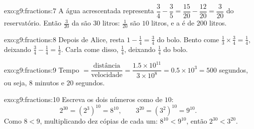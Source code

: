 \begin{solution}{exo:g9:fractions:7}
A água acrescentada representa
$\dfrac34 - \dfrac35 = \dfrac{15}{20} - \dfrac{12}{20} =
\dfrac{3}{20}$ do reservatório. Então $\frac{3}{20}$ da  são
$30$ litros: $\frac{1}{20}$ são $10$ litros, e a  é de $200$
litros.
\end{solution}

\begin{solution}{exo:g9:fractions:8}
Depois de Alice, resta $1 - \frac14 = \frac34$ do bolo. Bento come
$\frac13 \times \frac34 = \frac14$, deixando
$\frac34 - \frac14 = \frac12$. Carla come  disso, $\frac14$,
deixando $\frac14$ do bolo.
\end{solution}

\begin{solution}{exo:g9:fractions:9}
Tempo $= \dfrac{\text{distância}}{\text{velocidade}} =
\dfrac{1.5 \times 10^{11}}{3 \times 10^8} = 0.5 \times 10^3 = 500$
segundos, ou seja, $8$ minutos e $20$ segundos.
\end{solution}

\begin{solution}{exo:g9:fractions:10}
Escreva os dois números como  de  $10$:
\[
2^{30} = \left(2^3\right)^{10} = 8^{10},
\qquad
3^{20} = \left(3^2\right)^{10} = 9^{10}.
\]
Como $8 < 9$, multiplicando dez cópias de cada um: $8^{10} < 9^{10}$,
então $2^{30} < 3^{20}$.
\end{solution}

